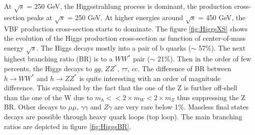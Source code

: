 At $\sqrt{s}$ = 250 GeV, the Higgsstrahlung process is dominant, the production cross-section peaks at $\sqrt{s}$ = 250 GeV. At higher energies around $\sqrt{s}$ = 450 GeV, the VBF production cross-section starts to dominate. The figure \ref{fig:HiggsXS} shows the evolution of the Higgs production cross-section as function of center-of-mass energy $\sqrt{s}$.
The Higgs decays mostly into a pair of b quarks ($\sim$ 57\%). The next highest branching ratio (BR) is to a $WW^*$ pair ($\sim$ 21\%). Then in the order of few percents, the Higgs decays to $gg$, $ZZ^*$, $\tau \tau$, $cc$. The difference of BR between $h \rightarrow WW^*$ and $h \rightarrow ZZ^*$ is quite interesting with an order of magnitude difference. This explained by the fact that the one of the Z is further off-shell than the one of the W due to $m_h << 2 \times m_W < 2 \times m_Z$ thus suppressing the Z BR.
Other decays to $\mu \mu$, $\gamma \gamma$ and $Z\gamma$ are very rare below 1\%. Massless final states decays are possible through heavy quark loops (top loop). The main branching ratios are depicted in figure \ref{fig:HiggsBR}.

